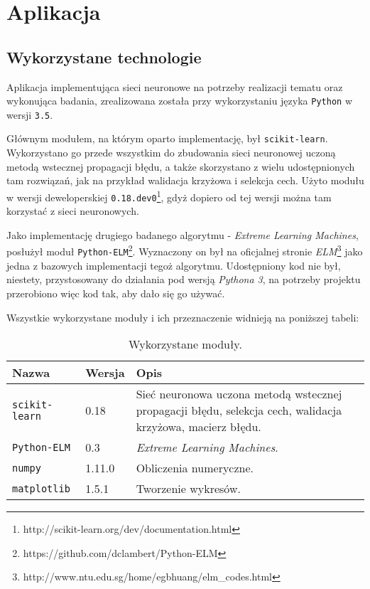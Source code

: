 \chapter{Aplikacja}

\section{Wykorzystane technologie}

Aplikacja implementująca sieci neuronowe na potrzeby realizacji tematu oraz wykonująca badania, zrealizowana została przy wykorzystaniu języka \texttt{Python} w wersji \texttt{3.5}.

Głównym modułem, na którym oparto implementację, był \texttt{scikit-learn}. Wykorzystano go przede wszystkim do zbudowania sieci neuronowej uczoną metodą wstecznej propagacji błędu, a także skorzystano z wielu udostępnionych tam rozwiązań, jak na przykład walidacja krzyżowa i selekcja cech. Użyto modułu w wersji deweloperskiej \texttt{0.18.dev0}\footnote{http://scikit-learn.org/dev/documentation.html}, gdyż dopiero od tej wersji można tam korzystać z sieci neuronowych.

Jako implementację drugiego badanego algorytmu - \textit{Extreme Learning Machines}, posłużył moduł \texttt{Python-ELM}\footnote{https://github.com/dclambert/Python-ELM}. Wyznaczony on był na oficjalnej stronie \textit{ELM}\footnote{http://www.ntu.edu.sg/home/egbhuang/elm\_codes.html} jako jedna z bazowych implementacji tegoż algorytmu. Udostępniony kod nie był, niestety, przystosowany do działania pod wersją \textit{Pythona 3}, na potrzeby projektu przerobiono więc kod tak, aby dało się go używać.

Wszystkie wykorzystane moduły i ich przeznaczenie widnieją na poniższej tabeli:

\begin{table}[h!]
    \centering
    \caption{Wykorzystane moduły.}
    \begin{tabular}{p{3cm}p{2cm}p{11cm}}
        \toprule
        \textbf{Nazwa} & \textbf{Wersja} & \textbf{Opis} \\
        \midrule
        \texttt{scikit-learn} & 0.18 & Sieć neuronowa uczona metodą wstecznej propagacji błędu, selekcja cech, walidacja krzyżowa, macierz błędu. \\
        \texttt{Python-ELM} & 0.3 & \textit{Extreme Learning Machines}. \\
        \texttt{numpy} & 1.11.0 & Obliczenia numeryczne. \\
        \texttt{matplotlib} & 1.5.1 & Tworzenie wykresów. \\
        \bottomrule
    \end{tabular}
\end{table}

